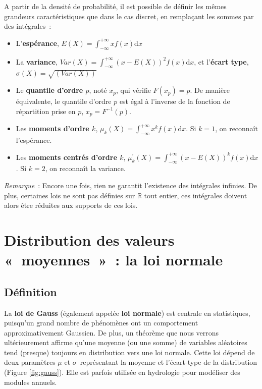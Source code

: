 \documentclass[
]{book}
\providecommand{\tightlist}{%
  \setlength{\itemsep}{0pt}\setlength{\parskip}{0pt}}
\begin{document}
A partir de la densité de probabilité, il est possible de définir les mêmes grandeurs caractéristiques que dans le cas discret, en remplaçant les sommes par des intégrales~:

\begin{itemize}
\tightlist
\item
  L'\textbf{espérance}, \(E(X)=\int_{-\infty}^{+\infty}x f(x)\text{d}x\)
\item
  La \textbf{variance}, \(Var(X)=\int_{-\infty}^{+\infty}(x-E(X))^2 f(x)\text{d}x\), et l'\textbf{écart type}, \(\sigma(X)=\sqrt{\left( Var(X) \right)}\)
\item
  Le \textbf{quantile d'ordre \(p\)}, noté \(x_p\), qui vérifie \(F(x_p)=p\). De manière équivalente, le quantile d'ordre \(p\) est égal à l'inverse de la fonction de répartition prise en \(p\), \(x_p=F^{-1}(p)\).
\item
  Les \textbf{moments d'ordre \(k\)}, \(\mu_k(X)=\int_{-\infty}^{+\infty}x^k f(x)\text{d}x\). Si \(k=1\), on reconnaît l'espérance.
\item
  Les \textbf{moments centrés d'ordre \(k\)}, \(\mu^\prime_k(X)=\int_{-\infty}^{+\infty}(x-E(X))^k f(x)\text{d}x\). Si \(k=2\), on reconnaît la variance.
\end{itemize}

\emph{Remarque}~: Encore une fois, rien ne garantit l'existence des intégrales infinies. De plus, certaines lois ne sont pas définies sur \(\mathbb{R}\) tout entier, ces intégrales doivent alors être réduites aux supports de ces lois.

\section{Distribution des valeurs «~moyennes~»~: la loi normale}\label{sec:gauss}

\subsection{Définition}\label{duxe9finition}

La \textbf{loi de Gauss} (également appelée \textbf{loi normale}) est centrale en statistiques, puisqu'un grand nombre de phénomènes ont un comportement approximativement Gaussien. De plus, un théorème que nous verrons ultérieurement affirme qu'une moyenne (ou une somme) de variables aléatoires tend (presque) toujours en distribution vers une loi normale. Cette loi dépend de deux paramètres \(\mu\) et \(\sigma\)~représentant la moyenne et l'écart-type de la distribution (Figure \ref{fig:gauss}). Elle est parfois utilisée en hydrologie pour modéliser des modules annuels.
\end{document}
